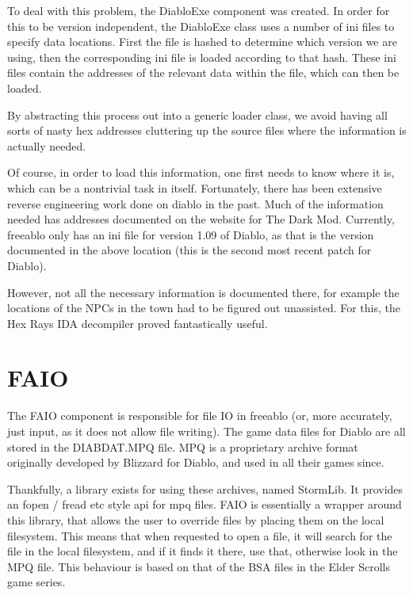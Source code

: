 	To deal with this problem, the DiabloExe component was created. In order for this to be version independent, the DiabloExe class uses a number of ini files to specify data locations. First the file is hashed to determine which version we are using, then the corresponding ini file is loaded according to that hash. These ini files contain the addresses of the relevant data within the file, which can then be loaded.
	
	By abstracting this process out into a generic loader class, we avoid having all sorts of nasty hex addresses cluttering up the source files where the information is actually needed.
	
	Of course, in order to load this information, one first needs to know where it is, which can be a nontrivial task in itself. Fortunately, there has been extensive reverse engineering work done on diablo in the past. Much of the information needed has addresses documented on the website for The Dark Mod\cite{dmodhex}. Currently, freeablo only has an ini file for version 1.09 of Diablo, as that is the version documented in the above location (this is the second most recent patch for Diablo).
	
	However, not all the necessary information is documented there, for example the locations of the NPCs in the town had to be figured out unassisted. For this, the Hex Rays IDA\cite{hexrays} decompiler proved fantastically useful.

\section{FAIO}
	The FAIO component is responsible for file IO in freeablo (or, more accurately, just input, as it does not allow file writing).
	The game data files for Diablo are all stored in the DIABDAT.MPQ file. MPQ is a proprietary archive format originally developed by Blizzard for Diablo, and used in all their games since.
	
	Thankfully, a library exists for using these archives, named StormLib\cite{stormlib}. It provides an fopen / fread etc style api for mpq files.
	FAIO is essentially a wrapper around this library, that allows the user to override files by placing them on the local filesystem. This means that when requested to open a file, it will search for the file in the local filesystem, and if it finds it there, use that, otherwise look in the MPQ file.
	This behaviour is based on that of the BSA files in the Elder Scrolls game series.
	
